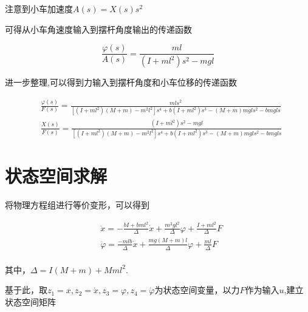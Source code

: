 注意到小车加速度$A(s)=X(s)s^2$

可得从小车角速度输入到摆杆角度输出的传递函数

\begin{equation}
\frac{\varphi(s)}{A(s)}=\frac{ml}{(I+ml^2)s^2-mgl}
\end{equation}

进一步整理,可以得到力输入到摆杆角度和小车位移的传递函数

\begin{equation}
\begin{aligned}
&\frac{\varphi(s)}{F(s)}=\frac{mls^2}{[(I+ml^2)(M+m)-m^2l^2]s^4+b(I+ml^2)s^3-(M+m)mgls^2-bmgls}\\
&\frac{X(s)}{F(s)}=\frac{(I+ml^2)s^2-mgl}{[(I+ml^2)(M+m)-m^2l^2]s^4+b(I+ml^2)s^3-(M+m)mgls^2-bmgls}
\end{aligned}
\end{equation}

\section{状态空间求解}

将物理方程组进行等价变形，可以得到

\begin{equation}
\begin{aligned}
&\ddot x=-\frac{bI+bml^2}{\Delta}\dot x+\frac{m^2gl^2}{\Delta}\varphi+\frac{I+ml^2}{\Delta}F\\
&\ddot{\varphi}=\frac{-mlb}{\Delta}\dot x+\frac{mg(M+m)l}{\Delta}\varphi+\frac{ml}{\Delta}F\\
\end{aligned}
\end{equation}

其中，$\Delta=I(M+m)+Mml^2$.

基于此，取$z_1=x,z_2=\dot x,z_3=\varphi,z_4=\dot{\varphi}$为状态空间变量，以力$F$作为输入$u$,建立状态空间矩阵


